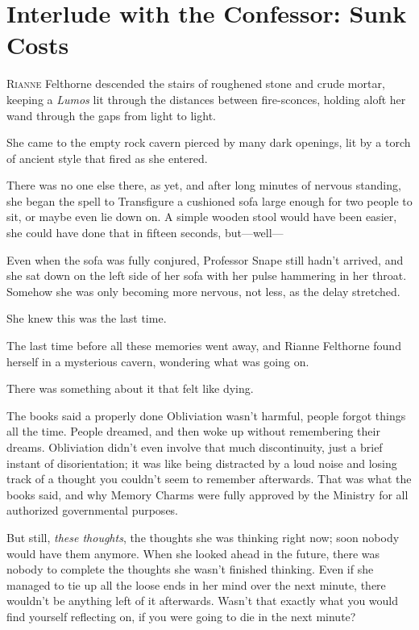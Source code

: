 \chapter{Interlude with the Confessor: Sunk Costs}

\lettrine{R}{ianne} Felthorne descended the stairs of roughened stone and crude mortar, keeping a \emph{Lumos} lit through the distances between fire-sconces, holding aloft her wand through the gaps from light to light.

She came to the empty rock cavern pierced by many dark openings, lit by a torch of ancient style that fired as she entered.

There was no one else there, as yet, and after long minutes of nervous standing, she began the spell to Transfigure a cushioned sofa large enough for two people to sit, or maybe even lie down on. A simple wooden stool would have been easier, she could have done that in fifteen seconds, but---well---

Even when the sofa was fully conjured, Professor Snape still hadn't arrived, and she sat down on the left side of her sofa with her pulse hammering in her throat. Somehow she was only becoming more nervous, not less, as the delay stretched.

She knew this was the last time.

The last time before all these memories went away, and Rianne Felthorne found herself in a mysterious cavern, wondering what was going on.

There was something about it that felt like dying.

The books said a properly done Obliviation wasn't harmful, people forgot things all the time. People dreamed, and then woke up without remembering their dreams. Obliviation didn't even involve that much discontinuity, just a brief instant of disorientation; it was like being distracted by a loud noise and losing track of a thought you couldn't seem to remember afterwards. That was what the books said, and why Memory Charms were fully approved by the Ministry for all authorized governmental purposes.

But still, \emph{these thoughts}, the thoughts she was thinking right now; soon nobody would have them anymore. When she looked ahead in the future, there was nobody to complete the thoughts she wasn't finished thinking. Even if she managed to tie up all the loose ends in her mind over the next minute, there wouldn't be anything left of it afterwards. Wasn't that exactly what you would find yourself reflecting on, if you were going to die in the next minute?

